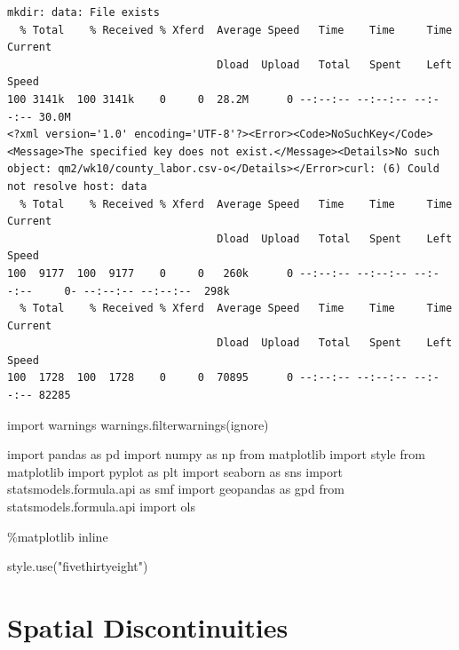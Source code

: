 \documentclass[
  letterpaper,
  DIV=11,
  numbers=noendperiod]{scrreprt}
\newenvironment{Shaded}{\begin{snugshade}}{\end{snugshade}}
\newcommand{\ImportTok}[1]{\textcolor[rgb]{0.00,0.46,0.62}{#1}}
\newcommand{\NormalTok}[1]{\textcolor[rgb]{0.00,0.23,0.31}{#1}}
\newcommand{\OperatorTok}[1]{\textcolor[rgb]{0.37,0.37,0.37}{#1}}
\newcommand{\StringTok}[1]{\textcolor[rgb]{0.13,0.47,0.30}{#1}}
\begin{document}
\begin{verbatim}
mkdir: data: File exists
  % Total    % Received % Xferd  Average Speed   Time    Time     Time  Current
                                 Dload  Upload   Total   Spent    Left  Speed
100 3141k  100 3141k    0     0  28.2M      0 --:--:-- --:--:-- --:--:-- 30.0M
<?xml version='1.0' encoding='UTF-8'?><Error><Code>NoSuchKey</Code><Message>The specified key does not exist.</Message><Details>No such object: qm2/wk10/county_labor.csv-o</Details></Error>curl: (6) Could not resolve host: data
  % Total    % Received % Xferd  Average Speed   Time    Time     Time  Current
                                 Dload  Upload   Total   Spent    Left  Speed
100  9177  100  9177    0     0   260k      0 --:--:-- --:--:-- --:--:--     0- --:--:-- --:--:--  298k
  % Total    % Received % Xferd  Average Speed   Time    Time     Time  Current
                                 Dload  Upload   Total   Spent    Left  Speed
100  1728  100  1728    0     0  70895      0 --:--:-- --:--:-- --:--:-- 82285
\end{verbatim}

\begin{Shaded}
\begin{Highlighting}[]
\ImportTok{import}\NormalTok{ warnings}
\NormalTok{warnings.filterwarnings(}\StringTok{\textquotesingle{}ignore\textquotesingle{}}\NormalTok{)}

\ImportTok{import}\NormalTok{ pandas }\ImportTok{as}\NormalTok{ pd}
\ImportTok{import}\NormalTok{ numpy }\ImportTok{as}\NormalTok{ np}
\ImportTok{from}\NormalTok{ matplotlib }\ImportTok{import}\NormalTok{ style}
\ImportTok{from}\NormalTok{ matplotlib }\ImportTok{import}\NormalTok{ pyplot }\ImportTok{as}\NormalTok{ plt}
\ImportTok{import}\NormalTok{ seaborn }\ImportTok{as}\NormalTok{ sns}
\ImportTok{import}\NormalTok{ statsmodels.formula.api }\ImportTok{as}\NormalTok{ smf}
\ImportTok{import}\NormalTok{ geopandas }\ImportTok{as}\NormalTok{ gpd}
\ImportTok{from}\NormalTok{ statsmodels.formula.api }\ImportTok{import}\NormalTok{ ols}

\OperatorTok{\%}\NormalTok{matplotlib inline}

\NormalTok{style.use(}\StringTok{"fivethirtyeight"}\NormalTok{)}
\end{Highlighting}
\end{Shaded}


\hypertarget{spatial-discontinuities}{%
\chapter{Spatial Discontinuities}\label{spatial-discontinuities}}
\end{document}
